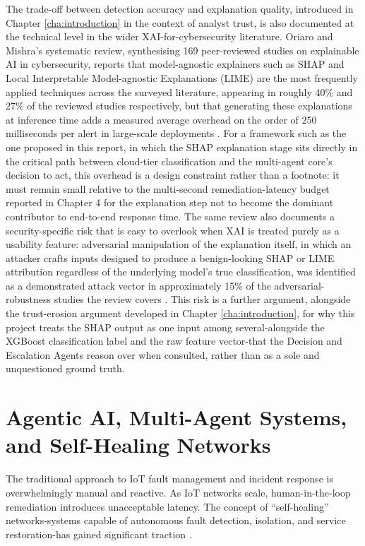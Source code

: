 The trade-off between detection accuracy and explanation quality, introduced in Chapter \ref{cha:introduction} in the context of analyst trust, is also documented at the technical level in the wider XAI-for-cybersecurity literature. Oriaro and Mishra's systematic review, synthesising 169 peer-reviewed studies on explainable AI in cybersecurity, reports that model-agnostic explainers such as SHAP and Local Interpretable Model-agnostic Explanations (LIME) are the most frequently applied techniques across the surveyed literature, appearing in roughly 40\% and 27\% of the reviewed studies respectively, but that generating these explanations at inference time adds a measured average overhead on the order of 250 milliseconds per alert in large-scale deployments \cite{Oriaro2025}. For a framework such as the one proposed in this report, in which the SHAP explanation stage sits directly in the critical path between cloud-tier classification and the multi-agent core's decision to act, this overhead is a design constraint rather than a footnote: it must remain small relative to the multi-second remediation-latency budget reported in Chapter 4 for the explanation step not to become the dominant contributor to end-to-end response time. The same review also documents a security-specific risk that is easy to overlook when XAI is treated purely as a usability feature: adversarial manipulation of the explanation itself, in which an attacker crafts inputs designed to produce a benign-looking SHAP or LIME attribution regardless of the underlying model's true classification, was identified as a demonstrated attack vector in approximately 15\% of the adversarial-robustness studies the review covers \cite{Oriaro2025}. This risk is a further argument, alongside the trust-erosion argument developed in Chapter \ref{cha:introduction}, for why this project treats the SHAP output as one input among several-alongside the XGBoost classification label and the raw feature vector-that the Decision and Escalation Agents reason over when consulted, rather than as a sole and unquestioned ground truth.

\section{Agentic AI, Multi-Agent Systems, and Self-Healing Networks}

The traditional approach to IoT fault management and incident response is overwhelmingly manual and reactive. As IoT networks scale, human-in-the-loop remediation introduces unacceptable latency. The concept of ``self-healing'' networks-systems capable of autonomous fault detection, isolation, and service restoration-has gained significant traction \cite{Manju2025}.

